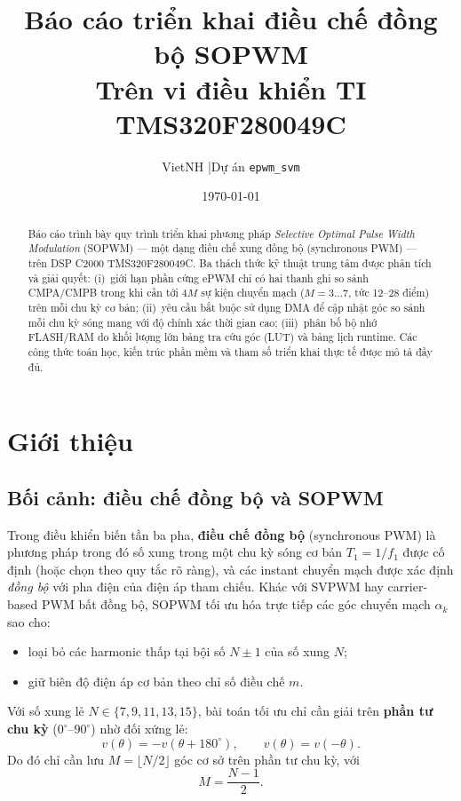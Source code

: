 \documentclass[12pt,a4paper]{article}
\title{%
  \textbf{Báo cáo triển khai điều chế đồng bộ SOPWM}\\[0.4em]
  \large Trên vi điều khiển TI TMS320F280049C
}
\author{VietNH \quad|\quad Dự án \texttt{epwm\_svm}}
\date{\today}
\begin{document}
\maketitle

\begin{abstract}
Báo cáo trình bày quy trình triển khai phương pháp \emph{Selective Optimal Pulse Width Modulation} (SOPWM) --- một dạng điều chế xung đồng bộ (synchronous PWM) --- trên DSP C2000 TMS320F280049C. Ba thách thức kỹ thuật trung tâm được phân tích và giải quyết: (i)~giới hạn phần cứng ePWM chỉ có hai thanh ghi so sánh CMPA/CMPB trong khi cần tới $4M$ sự kiện chuyển mạch ($M=3\ldots7$, tức 12--28 điểm) trên mỗi chu kỳ cơ bản; (ii)~yêu cầu bắt buộc sử dụng DMA để cập nhật góc so sánh mỗi chu kỳ sóng mang với độ chính xác thời gian cao; (iii)~phân bố bộ nhớ FLASH/RAM do khối lượng lớn bảng tra cứu góc (LUT) và bảng lịch runtime. Các công thức toán học, kiến trúc phần mềm và tham số triển khai thực tế được mô tả đầy đủ.
\end{abstract}

\tableofcontents
\newpage

\section{Giới thiệu}

\subsection{Bối cảnh: điều chế đồng bộ và SOPWM}

Trong điều khiển biến tần ba pha, \textbf{điều chế đồng bộ} (synchronous PWM) là phương pháp trong đó số xung trong một chu kỳ sóng cơ bản $T_1 = 1/f_1$ được cố định (hoặc chọn theo quy tắc rõ ràng), và các instant chuyển mạch được xác định \emph{đồng bộ} với pha điện của điện áp tham chiếu. Khác với SVPWM hay carrier-based PWM bất đồng bộ, SOPWM tối ưu hóa trực tiếp các góc chuyển mạch $\alpha_k$ sao cho:
\begin{itemize}[noitemsep]
  \item loại bỏ các harmonic thấp tại bội số $N \pm 1$ của số xung $N$;
  \item giữ biên độ điện áp cơ bản theo chỉ số điều chế $m$.
\end{itemize}

Với số xung lẻ $N \in \{7,9,11,13,15\}$, bài toán tối ưu chỉ cần giải trên \textbf{phần tư chu kỳ} ($0^\circ$--$90^\circ$) nhờ đối xứng lẻ:
\begin{equation}
  v(\theta) = -v(\theta + 180^\circ), \qquad
  v(\theta) = v(-\theta).
  \label{eq:odd_symmetry}
\end{equation}
Do đó chỉ cần lưu $M = \lfloor N/2 \rfloor$ góc cơ sở trên phần tư chu kỳ, với
\begin{equation}
  M = \frac{N-1}{2}.
  \label{eq:M_def}
\end{equation}
\end{document}
